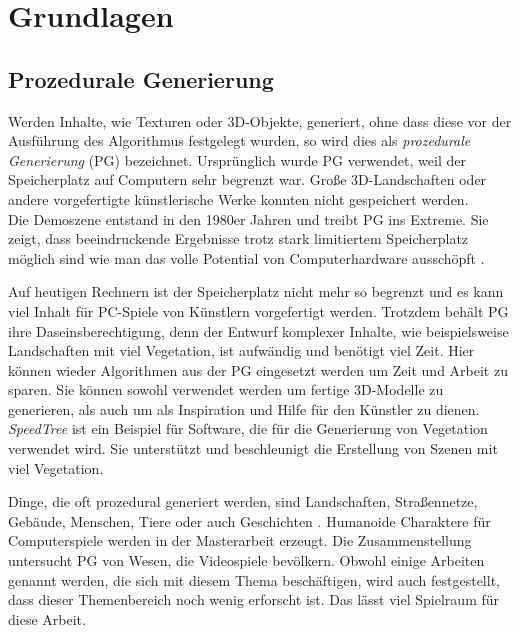 \chapter{Grundlagen}

\section{Prozedurale Generierung}

Werden Inhalte, wie Texturen oder 3D-Objekte, generiert, ohne dass diese vor der Ausführung des Algorithmus festgelegt wurden, so wird dies als \emph{prozedurale Generierung} (PG) bezeichnet.
Ursprünglich wurde PG verwendet, weil der Speicherplatz auf Computern sehr begrenzt war. Große 3D-Landschaften oder andere vorgefertigte künstlerische Werke konnten nicht gespeichert werden.\\
Die Demoszene entstand in den 1980er Jahren und treibt PG ins Extreme. Sie zeigt, dass beeindruckende Ergebnisse trotz stark limitiertem Speicherplatz möglich sind \bzw wie man das volle Potential von Computerhardware ausschöpft  \cite{DemoScene}. 

Auf heutigen Rechnern ist der Speicherplatz nicht mehr so begrenzt und es kann viel Inhalt für \zb PC-Spiele von Künstlern vorgefertigt werden. Trotzdem behält PG ihre Daseinsberechtigung, denn der Entwurf komplexer Inhalte, wie beispielsweise Landschaften mit viel Vegetation, ist aufwändig und benötigt viel Zeit. Hier können wieder Algorithmen aus der PG eingesetzt werden um Zeit und Arbeit zu sparen. Sie können sowohl verwendet werden um fertige 3D-Modelle zu generieren, als auch um als Inspiration und Hilfe für den Künstler zu dienen. \emph{SpeedTree} \cite{SpeedTree} ist ein Beispiel für Software, die für die Generierung von Vegetation verwendet wird. Sie unterstützt und beschleunigt die Erstellung von Szenen mit viel Vegetation. \cite{PCGSurvey_videoGames}

Dinge, die oft prozedural generiert werden, sind Landschaften, Straßennetze, Gebäude, Menschen, Tiere oder auch Geschichten \cite{PCGSurvey}. Humanoide Charaktere für Computerspiele werden \zb in der Masterarbeit \cite{ProceduralCharacterGeneration} erzeugt. Die Zusammenstellung \cite{PCGSurvey_videoGames} untersucht PG von Wesen, die Videospiele bevölkern. Obwohl einige Arbeiten genannt werden, die sich mit diesem Thema beschäftigen, wird auch festgestellt, dass dieser Themenbereich noch wenig erforscht ist. Das lässt viel Spielraum für diese Arbeit.

